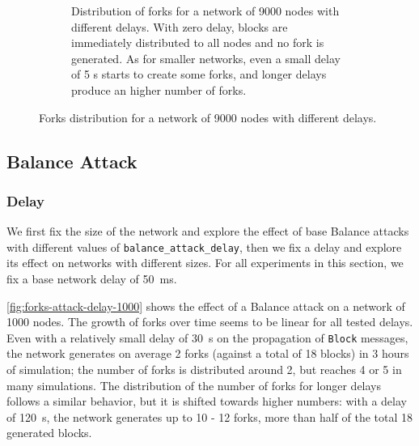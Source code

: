 \begin{figure}[ht]
\begin{subfigure}{\textwidth}
		\vspace*{0.25cm}
		\caption{
			Distribution of forks for a network of \num{9000} nodes with different delays.
			With zero delay, blocks are immediately distributed to all nodes and no fork is generated.
			As for smaller networks, even a small delay of \num{5} s starts to create some forks, and longer delays produce an higher number of forks.
		}
		\vspace*{0.25cm}
	\end{subfigure}
	\caption[Forks distribution for a network of 9000 nodes with different delays]{
		Forks distribution for a network of \num{9000} nodes with different delays.
	}
	\label{fig:forks-delay-9000}
\end{figure}

\subsection{Balance Attack}

\subsubsection{Delay}
We first fix the size of the network and explore the effect of base Balance attacks with different values of \texttt{balance\_attack\_delay}, then we fix a delay and explore its effect on networks with different sizes.
For all experiments in this section, we fix a base network delay of \SI{50}{\milli\second}.

\medskip
\cref{fig:forks-attack-delay-1000} shows the effect of a Balance attack on a network of \num{1000} nodes.
The growth of forks over time seems to be linear for all tested delays.
Even with a relatively small delay of \SI{30}{\second} on the propagation of \texttt{Block} messages, the network generates on average \num{2} forks (against a total of \num{18} blocks) in \num{3} hours of simulation;
the number of forks is distributed around \num{2}, but reaches \num{4} or \num{5} in many simulations.
The distribution of the number of forks for longer delays follows a similar behavior, but it is shifted towards higher numbers:
with a delay of \SI{120}{\second}, the network generates up to \num{10} - \num{12} forks, more than half of the total \num{18} generated blocks.

